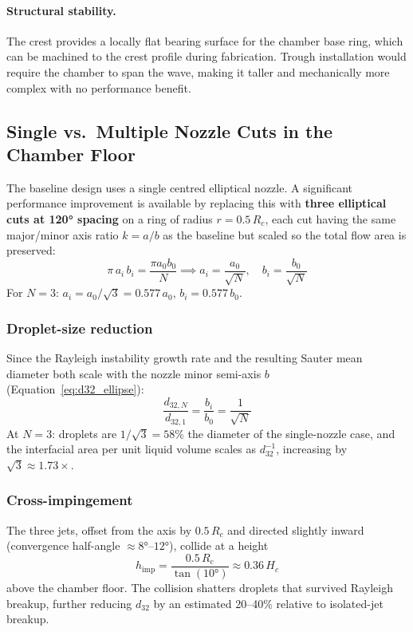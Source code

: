 \documentclass[11pt,letterpaper]{article}
\begin{document}
\paragraph{Structural stability.}
The crest provides a locally flat bearing surface for the chamber base
ring, which can be machined to the crest profile during fabrication.
Trough installation would require the chamber to span the wave, making
it taller and mechanically more complex with no performance benefit.

\subsection{Single vs.\ Multiple Nozzle Cuts in the Chamber Floor}
\label{sec:multi_nozzle}

The baseline design uses a single centred elliptical nozzle.  A
significant performance improvement is available by replacing this with
\textbf{three elliptical cuts at 120° spacing} on a ring of radius
$r = 0.5\,R_c$, each cut having the same major/minor axis ratio $k = a/b$
as the baseline but scaled so the total flow area is preserved:
\begin{equation}
  \pi\,a_i\,b_i = \frac{\pi a_0 b_0}{N} \implies a_i = \frac{a_0}{\sqrt{N}},
  \quad b_i = \frac{b_0}{\sqrt{N}}
  \label{eq:scaled_nozzle}
\end{equation}
For $N = 3$: $a_i = a_0/\sqrt{3} = 0.577\,a_0$, $b_i = 0.577\,b_0$.

\subsubsection{Droplet-size reduction}

Since the Rayleigh instability growth rate and the resulting Sauter mean
diameter both scale with the nozzle minor semi-axis $b$
(Equation~\ref{eq:d32_ellipse}):
\begin{equation}
  \frac{d_{32,N}}{d_{32,1}} = \frac{b_i}{b_0} = \frac{1}{\sqrt{N}}
  \label{eq:dsv_scaling}
\end{equation}
At $N = 3$: droplets are $1/\sqrt{3} = 58\%$ the diameter of the single-nozzle
case, and the interfacial area per unit liquid volume scales as
$d_{32}^{-1}$, increasing by $\sqrt{3} \approx 1.73\times$.

\subsubsection{Cross-impingement}

The three jets, offset from the axis by $0.5\,R_c$ and directed slightly
inward (convergence half-angle $\approx 8°$--$12°$), collide at a
height
\[
  h_{\mathrm{imp}} = \frac{0.5\,R_c}{\tan(10°)} \approx 0.36\,H_c
\]
above the chamber floor.  The collision shatters droplets that
survived Rayleigh breakup, further reducing $d_{32}$ by an estimated
20--40\% relative to isolated-jet breakup.
\end{document}
